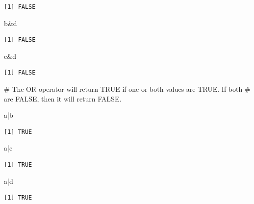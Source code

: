 \documentclass[
  letterpaper,
  DIV=11,
  numbers=noendperiod]{scrreprt}
\newenvironment{Shaded}{\begin{snugshade}}{\end{snugshade}}
\newcommand{\CommentTok}[1]{\textcolor[rgb]{0.37,0.37,0.37}{#1}}
\newcommand{\NormalTok}[1]{\textcolor[rgb]{0.00,0.23,0.31}{#1}}
\newcommand{\SpecialCharTok}[1]{\textcolor[rgb]{0.37,0.37,0.37}{#1}}
\begin{document}
\begin{verbatim}
[1] FALSE
\end{verbatim}

\begin{Shaded}
\begin{Highlighting}[]
\NormalTok{b}\SpecialCharTok{\&}\NormalTok{d}
\end{Highlighting}
\end{Shaded}

\begin{verbatim}
[1] FALSE
\end{verbatim}

\begin{Shaded}
\begin{Highlighting}[]
\NormalTok{c}\SpecialCharTok{\&}\NormalTok{d}
\end{Highlighting}
\end{Shaded}

\begin{verbatim}
[1] FALSE
\end{verbatim}

\begin{Shaded}
\begin{Highlighting}[]
\CommentTok{\# The OR operator will return TRUE if one or both values are TRUE. If both}
\CommentTok{\# are FALSE, then it will return FALSE.}

\NormalTok{a}\SpecialCharTok{|}\NormalTok{b}
\end{Highlighting}
\end{Shaded}

\begin{verbatim}
[1] TRUE
\end{verbatim}

\begin{Shaded}
\begin{Highlighting}[]
\NormalTok{a}\SpecialCharTok{|}\NormalTok{c}
\end{Highlighting}
\end{Shaded}

\begin{verbatim}
[1] TRUE
\end{verbatim}

\begin{Shaded}
\begin{Highlighting}[]
\NormalTok{a}\SpecialCharTok{|}\NormalTok{d}
\end{Highlighting}
\end{Shaded}

\begin{verbatim}
[1] TRUE
\end{verbatim}
\end{document}
